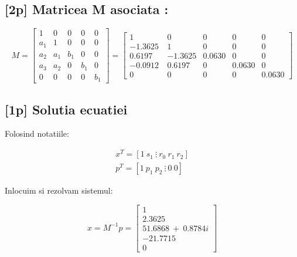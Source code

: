 \documentclass[12pt,english]{article}
\begin{document}
\subsection {[2p]  Matricea M asociata : }
\begin{center}
  \begin{equation*}
  M=\begin{bmatrix}
  1 	& 0 	& 0 	& 0 	& 0\\
  a_{1} & 1 	& 0 	& 0 	& 0\\
  a_{2} & a_{1} & b_{1} & 0 	& 0\\
  a_{3} & a_{2} & 0 	& b_{1} & 0\\
  0 	& 0 	& 0 	& 0 	& b_{1}
  \end{bmatrix} =\begin{bmatrix}
  1 		& 0 		& 0 		& 0 		& 0\\
  -1.3625\  & 1 		& 0 		& 0 		& 0\\
  0.6197 	& -1.3625 	& 0.0630 	& 0 		& 0\\
  -0.0912 	& 0.6197 	& 0 		& 0.0630 	& 0\\
  0 		& 0 		& 0 		& 0 		& 0.0630
  \end{bmatrix}
  \end{equation*}
\end{center}

\subsection {[1p] Solutia ecuatiei}

Folosind notatiile:
\begin{center}
  \begin{gather*}
  x^{T} =[ 1\ s_{1} \ \vdots \ r_{0} \ r_{1} \ r_{2}]\\
  p^{T} =[ 1\ p_{1} \ p_{2} \ \vdots \ 0 \ 0]
  \end{gather*}
\end{center}

Inlocuim si rezolvam sistemul:
\begin{center}
  \begin{equation*}
  x=M^{-1} p=\begin{bmatrix}
  1\\
  2.3625\\
  51.6868\ +\ 0.8784i\\
  -21.7715\ \\
  0
  \end{bmatrix}
  \end{equation*}
\end{center}
\end{document}
